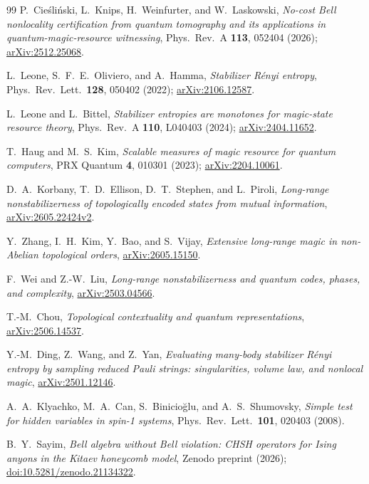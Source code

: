 \documentclass[aps,pra,twocolumn,superscriptaddress,longbibliography,floatfix,nofootinbib]{revtex4-2}
\begin{document}
\begin{thebibliography}{99}
P.~Cie\'sli\'nski, L.~Knips, H.~Weinfurter, and W.~Laskowski,
\emph{No-cost Bell nonlocality certification from quantum tomography
and its applications in quantum-magic-resource witnessing},
Phys.\ Rev.\ A \textbf{113}, 052404 (2026);
\href{https://arxiv.org/abs/2512.25068}{arXiv:2512.25068}.

L.~Leone, S.~F.~E.~Oliviero, and A.~Hamma,
\emph{Stabilizer Rényi entropy},
Phys.\ Rev.\ Lett.\ \textbf{128}, 050402 (2022);
\href{https://arxiv.org/abs/2106.12587}{arXiv:2106.12587}.

L.~Leone and L.~Bittel,
\emph{Stabilizer entropies are monotones for magic-state resource
theory},
Phys.\ Rev.\ A \textbf{110}, L040403 (2024);
\href{https://arxiv.org/abs/2404.11652}{arXiv:2404.11652}.

T.~Haug and M.~S.~Kim,
\emph{Scalable measures of magic resource for quantum computers},
PRX Quantum \textbf{4}, 010301 (2023);
\href{https://arxiv.org/abs/2204.10061}{arXiv:2204.10061}.

D.~A.~Korbany, T.~D.~Ellison, D.~T.~Stephen, and L.~Piroli,
\emph{Long-range nonstabilizerness of topologically encoded states
from mutual information},
\href{https://arxiv.org/abs/2605.22424v2}{arXiv:2605.22424v2}.

Y.~Zhang, I.~H.~Kim, Y.~Bao, and S.~Vijay,
\emph{Extensive long-range magic in non-Abelian topological orders},
\href{https://arxiv.org/abs/2605.15150}{arXiv:2605.15150}.

F.~Wei and Z.-W.~Liu,
\emph{Long-range nonstabilizerness and quantum codes, phases, and
complexity},
\href{https://arxiv.org/abs/2503.04566}{arXiv:2503.04566}.

T.-M.~Chou,
\emph{Topological contextuality and quantum representations},
\href{https://arxiv.org/abs/2506.14537}{arXiv:2506.14537}.

Y.-M.~Ding, Z.~Wang, and Z.~Yan,
\emph{Evaluating many-body stabilizer Rényi entropy by sampling
reduced Pauli strings: singularities, volume law, and nonlocal magic},
\href{https://arxiv.org/abs/2501.12146}{arXiv:2501.12146}.

A.~A.~Klyachko, M.~A.~Can, S.~Binicio\u{g}lu, and A.~S.~Shumovsky,
\emph{Simple test for hidden variables in spin-1 systems},
Phys.\ Rev.\ Lett.\ \textbf{101}, 020403 (2008).

B.~Y.~Sayim,
\emph{Bell algebra without Bell violation: CHSH operators for Ising
anyons in the Kitaev honeycomb model},
Zenodo preprint (2026);
\href{https://doi.org/10.5281/zenodo.21134322}{doi:10.5281/zenodo.21134322}.


\end{thebibliography}
\end{document}
